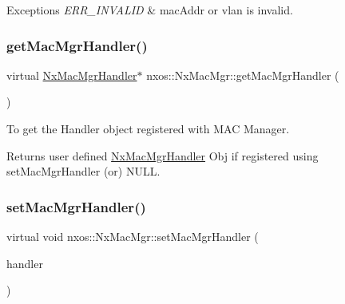 \begin{DoxyExceptions}{Exceptions}
{\em E\+R\+R\+\_\+\+I\+N\+V\+A\+L\+ID} & mac\+Addr or vlan is invalid. \\
\hline
\end{DoxyExceptions}
\mbox{\label{classnxos_1_1_nx_mac_mgr_a94e3fcb535f109501d319d72a24bdead}} 
\subsubsection{\texorpdfstring{get\+Mac\+Mgr\+Handler()}{getMacMgrHandler()}}
{\footnotesize\ttfamily virtual \mbox{\hyperlink{classnxos_1_1_nx_mac_mgr_handler}{Nx\+Mac\+Mgr\+Handler}}$\ast$ nxos\+::\+Nx\+Mac\+Mgr\+::get\+Mac\+Mgr\+Handler (\begin{DoxyParamCaption}{ }\end{DoxyParamCaption})\hspace{0.3cm}{\ttfamily [pure virtual]}}

To get the Handler object registered with M\+AC Manager.

\begin{DoxyReturn}{Returns}
user defined \mbox{\hyperlink{classnxos_1_1_nx_mac_mgr_handler}{Nx\+Mac\+Mgr\+Handler}} Obj if registered using set\+Mac\+Mgr\+Handler (or) N\+U\+LL. 
\end{DoxyReturn}
\mbox{\label{classnxos_1_1_nx_mac_mgr_a06f53bd41ddb17e6cfaef5a02b00415d}} 
\subsubsection{\texorpdfstring{set\+Mac\+Mgr\+Handler()}{setMacMgrHandler()}}
{\footnotesize\ttfamily virtual void nxos\+::\+Nx\+Mac\+Mgr\+::set\+Mac\+Mgr\+Handler (\begin{DoxyParamCaption}\item[{\mbox{\hyperlink{classnxos_1_1_nx_mac_mgr_handler}{Nx\+Mac\+Mgr\+Handler}} $\ast$}]{handler }\end{DoxyParamCaption})\hspace{0.3cm}{\ttfamily [pure virtual]}}


